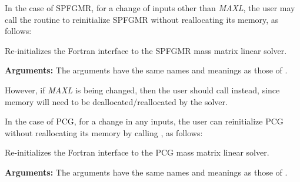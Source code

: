 \documentclass[letterpaper,10pt,english]{sphinxmanual}
\begin{document}
In the case of SPFGMR, for a change of inputs other than \emph{MAXL},
the user may call the routine {\hyperref[f_interface/Usage:f/_/FARKMASSSPFGMRREINIT]{\emph{}}} to
reinitialize SPFGMR without reallocating its memory, as follows:

\begin{fulllineitems}
\label{f_interface/Usage:f/_/FARKMASSSPFGMRREINIT}
Re-initializes the Fortran interface to the SPFGMR mass matrix
linear solver.

\textbf{Arguments:}  The arguments have the same names and meanings as
those of {\hyperref[f_interface/Usage:f/_/FARKMASSSPFGMR]{\emph{}}}.

\end{fulllineitems}


However, if \emph{MAXL} is being changed, then the user should call
{\hyperref[f_interface/Usage:f/_/FARKMASSSPFGMR]{\emph{}}} instead, since memory will need to be
deallocated/reallocated by the solver.

In the case of PCG, for a change in any inputs, the user can
reinitialize PCG without reallocating its memory by calling
{\hyperref[f_interface/Usage:f/_/FARKMASSPCGREINIT]{\emph{}}}, as follows:

\begin{fulllineitems}
\label{f_interface/Usage:f/_/FARKMASSPCGREINIT}
Re-initializes the Fortran interface to the PCG mass matrix
linear solver.

\textbf{Arguments:}  The arguments have the same names and meanings as
those of {\hyperref[f_interface/Usage:f/_/FARKMASSPCG]{\emph{}}}.

\end{fulllineitems}
\end{document}
